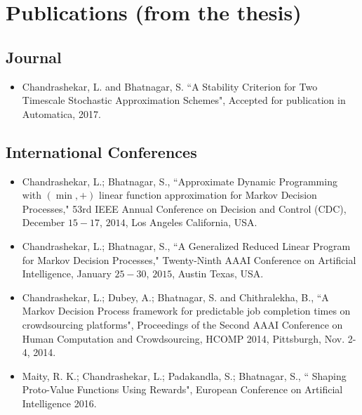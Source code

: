 \documentclass[line,margin]{res}
\begin{document}
\begin{resume}
\begin{itemize}
\end{itemize}
\begin{comment}
Solving MDPs typically involves computing the optimal value function and the optimal policy. However, most MDPs arising in practice have a large number of states and it is difficult to compute the optimal value function/policy. Approximate Dynamic Programming deal MDPs with large number of states by computing an approximate value function and a sub-optimal policy. The most widely used approach by ADP methods is linear function approximation wherein the value function is restricted to a subspace spanned by a set of basis functions.\par
Approximate Linear Programming (ALP) method has guaranteed performance for the sub-optimal policy it computes. A significant shortcoming of the ALP is that the number of constraints are large in the case MDPs with large number of states. In the thesis, we introduce the Generalized Reduced Linear Program 
\end{comment}
\section{Publications (from the thesis)}
\subsection{Journal}
\begin{itemize}
\item Chandrashekar, L. and  Bhatnagar, S. ``A Stability Criterion for Two Timescale Stochastic Approximation Schemes", Accepted for publication in Automatica, 2017.
\end{itemize}
\subsection{International Conferences}
\begin{itemize}
\item Chandrashekar, L.; Bhatnagar, S., ``Approximate Dynamic Programming with $(\min,+)$ linear function approximation for Markov Decision Processes," 53rd IEEE Annual Conference on Decision and Control (CDC), December $15-17$, $2014$, Los Angeles California, USA.
\item Chandrashekar, L.; Bhatnagar, S., ``A Generalized Reduced Linear Program for Markov Decision Processes," Twenty-Ninth AAAI Conference on Artificial Intelligence, January $25-30$, $2015$, Austin Texas, USA.
\item Chandrashekar, L.;  Dubey, A.; Bhatnagar, S. and Chithralekha, B., ``A Markov Decision Process framework for predictable job completion times on crowdsourcing platforms", Proceedings of the Second {AAAI} Conference on Human Computation and Crowdsourcing, {HCOMP} 2014, Pittsburgh, Nov. 2-4, 2014.
\item Maity, R. K.; Chandrashekar, L.;  Padakandla, S.; Bhatnagar, S., ``
Shaping Proto-Value Functions Using Rewards", European Conference on Artificial Intelligence 2016.
\end{itemize}

\end{resume}
\end{document}
